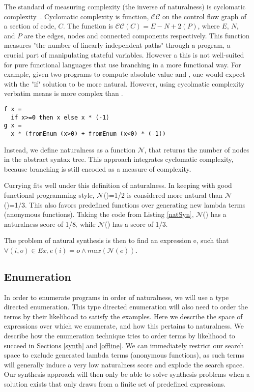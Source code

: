 The standard of measuring complexity (the inverse of naturalness) is cyclomatic complexity~\cite{McCabe:1976:CM:800253.807712}.
Cyclomatic complexity is function, $\mathcal{CC}$ on the control flow graph of a section of code, $C$.
The function is $\mathcal{CC}(C) = E − N + 2(P)$, where $E$, $N$, and $P$ are the edges, nodes and connected components respectively.
This function measures "the number of linearly independent paths" through a program, a crucial part of manipulating stateful variables.
However a this is not well-suited for pure functional languages that use branching in a more functional way.
For example, given two programs to compute absolute value  and , one would expect  with the "if" solution to be more natural.
However, using cycolmatic complexity verbatim means  is more complex than .

\begin{lstlisting}
f x =
  if x>=0 then x else x * (-1)
g x = 
  x * (fromEnum (x>0) + fromEnum (x<0) * (-1))
\end{lstlisting}

Instead, we define naturalness as a function $\mathcal{N}$, that returns the number of nodes in the abstract syntax tree.
This approach integrates cyclomatic complexity, because branching is still encoded as a measure of complexity.

Currying fits well under this definition of naturalness.
In keeping with good functional programming style, $\mathcal{N}$()=1/2 is considered more natural than $\mathcal{N}$()=1/3.
This also favors predefined functions over generating new lambda terms (anonymous functions).
Taking the code from Listing \ref{natSyn}, $\mathcal{N}$() has a naturalness score of 1/8, while $\mathcal{N}$() has a score of 1/3.

The problem of natural synthesis is then to find an expression e, such that $\forall (i,o) \in Ex, e (i) = o \land max(\mathcal{N}(e))$.


\subsection{Enumeration}
In order to enumerate programs in order of naturalness, we will use a type directed enumeration.
This type directed enumeration will also need to order the terms by their likelihood to satisfy the examples.
Here we describe the space of expressions over which we enumerate, and how this pertains to naturalness.
We describe how the enumeration technique tries to order terms by likelihood to succeed in Sections \ref{synth} and \ref{offline}.
We can immediately restrict our search space to exclude generated lambda terms (anonymous functions), as such terms will generally induce a very low naturalness score and explode the search space.
Our synthesis approach will then only be able to solve synthesis problems when a solution exists that only draws from a finite set of predefined expressions.

